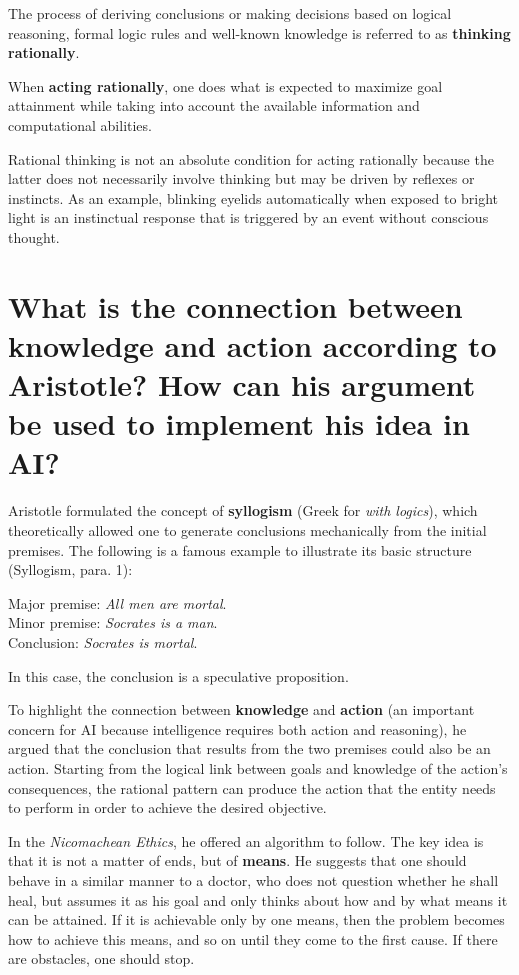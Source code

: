 \documentclass{article}
\begin{document}
The process of deriving conclusions or making decisions based on logical reasoning, formal logic rules and well-known knowledge is referred to as \textbf{thinking rationally}.

When \textbf{acting rationally}, one does what is expected to maximize goal attainment while taking into account the available information and computational abilities.

Rational thinking is not an absolute condition for acting rationally because the latter does not necessarily involve thinking but may be driven by reflexes or instincts.
As an example, blinking eyelids automatically when exposed to bright light is an instinctual response that is triggered by an event without conscious thought.


\section{What is the connection between knowledge and action according to Aristotle? How can his argument be used to implement his idea in AI?}
Aristotle formulated the concept of \textbf{syllogism} (Greek for \emph{with logics}), which theoretically allowed one to generate conclusions mechanically from the initial premises. 
The following is a famous example to illustrate its basic structure (Syllogism, para. 1):
\begin{center}
Major premise: \emph{All men are mortal}. \\
Minor premise: \emph{Socrates is a man}. \\
Conclusion: \emph{Socrates is mortal}. \\
\end{center}

In this case, the conclusion is a speculative proposition.

To highlight the connection between \textbf{knowledge} and \textbf{action} (an important concern for AI because intelligence requires both action and reasoning), he argued that the conclusion that results from the two premises could also be an action.
Starting from the logical link between goals and knowledge of the action’s consequences, the rational pattern can produce the action that the entity needs to perform in order to achieve the desired objective.

In the \textit{Nicomachean Ethics}, he offered an algorithm to follow.
The key idea is that it is not a matter of ends, but of \textbf{means}.
He suggests that one should behave in a similar manner to a doctor, who does not question whether he shall heal, but assumes it as his goal and only thinks about how and by what means it can be attained.
If it is achievable only by one means, then the problem becomes how to achieve this means, and so on until they come to the first cause.
If there are obstacles, one should stop.
\end{document}

